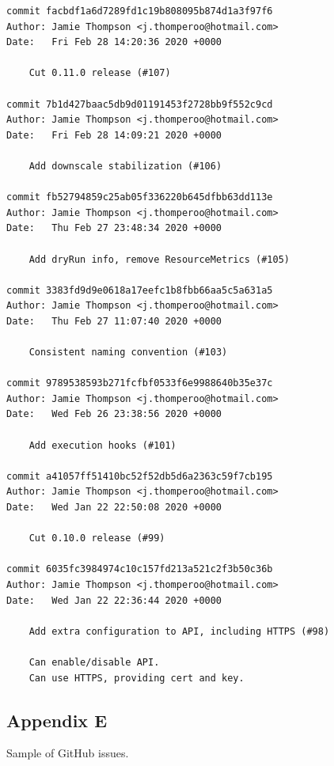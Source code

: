 \begin{lstlisting}
commit facbdf1a6d7289fd1c19b808095b874d1a3f97f6
Author: Jamie Thompson <j.thomperoo@hotmail.com>
Date:   Fri Feb 28 14:20:36 2020 +0000

    Cut 0.11.0 release (#107)

commit 7b1d427baac5db9d01191453f2728bb9f552c9cd
Author: Jamie Thompson <j.thomperoo@hotmail.com>
Date:   Fri Feb 28 14:09:21 2020 +0000

    Add downscale stabilization (#106)

commit fb52794859c25ab05f336220b645dfbb63dd113e
Author: Jamie Thompson <j.thomperoo@hotmail.com>
Date:   Thu Feb 27 23:48:34 2020 +0000

    Add dryRun info, remove ResourceMetrics (#105)

commit 3383fd9d9e0618a17eefc1b8fbb66aa5c5a631a5
Author: Jamie Thompson <j.thomperoo@hotmail.com>
Date:   Thu Feb 27 11:07:40 2020 +0000

    Consistent naming convention (#103)

commit 9789538593b271fcfbf0533f6e9988640b35e37c
Author: Jamie Thompson <j.thomperoo@hotmail.com>
Date:   Wed Feb 26 23:38:56 2020 +0000

    Add execution hooks (#101)

commit a41057ff51410bc52f52db5d6a2363c59f7cb195
Author: Jamie Thompson <j.thomperoo@hotmail.com>
Date:   Wed Jan 22 22:50:08 2020 +0000

    Cut 0.10.0 release (#99)

commit 6035fc3984974c10c157fd213a521c2f3b50c36b
Author: Jamie Thompson <j.thomperoo@hotmail.com>
Date:   Wed Jan 22 22:36:44 2020 +0000

    Add extra configuration to API, including HTTPS (#98)
    
    Can enable/disable API.
    Can use HTTPS, providing cert and key.
\end{lstlisting}
\newpage

\subsection*{Appendix E}

Sample of GitHub issues.

